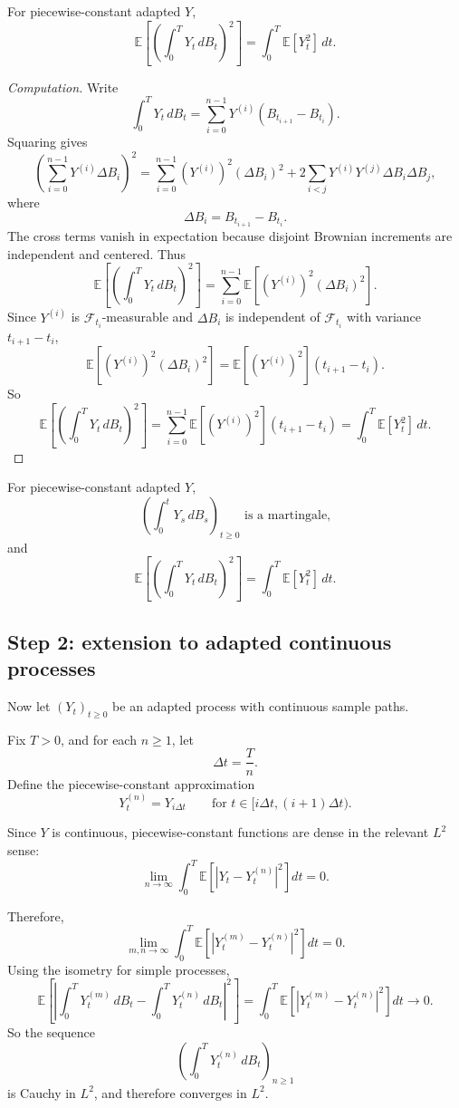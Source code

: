 \documentclass[11pt]{article}
\theoremstyle{definition}
\begin{document}
For piecewise-constant adapted \(Y\),
\[
\mathbb E\!\left[\left(\int_0^T Y_t\,dB_t\right)^2\right]
=
\int_0^T \mathbb E[Y_t^2]\,dt.
\]

\begin{proof}[Computation]
Write
\[
\int_0^T Y_t\,dB_t
=
\sum_{i=0}^{n-1} Y^{(i)}(B_{t_{i+1}}-B_{t_i}).
\]
Squaring gives
\[
\left(\sum_{i=0}^{n-1} Y^{(i)}\Delta B_i\right)^2
=
\sum_{i=0}^{n-1}(Y^{(i)})^2(\Delta B_i)^2
+
2\sum_{i<j} Y^{(i)}Y^{(j)}\Delta B_i\Delta B_j,
\]
where
\[
\Delta B_i=B_{t_{i+1}}-B_{t_i}.
\]
The cross terms vanish in expectation because disjoint Brownian increments are independent and centered. Thus
\[
\mathbb E\!\left[\left(\int_0^T Y_t\,dB_t\right)^2\right]
=
\sum_{i=0}^{n-1}\mathbb E\!\left[(Y^{(i)})^2(\Delta B_i)^2\right].
\]
Since \(Y^{(i)}\) is \(\mathcal F_{t_i}\)-measurable and \(\Delta B_i\) is independent of \(\mathcal F_{t_i}\) with variance \(t_{i+1}-t_i\),
\[
\mathbb E\!\left[(Y^{(i)})^2(\Delta B_i)^2\right]
=
\mathbb E[(Y^{(i)})^2](t_{i+1}-t_i).
\]
So
\[
\mathbb E\!\left[\left(\int_0^T Y_t\,dB_t\right)^2\right]
=
\sum_{i=0}^{n-1}\mathbb E[(Y^{(i)})^2](t_{i+1}-t_i)
=
\int_0^T \mathbb E[Y_t^2]\,dt.
\]
\end{proof}

\begin{keyformula}
For piecewise-constant adapted \(Y\),
\[
\left(\int_0^t Y_s\,dB_s\right)_{t\ge 0}
\text{ is a martingale,}
\]
and
\[
\mathbb E\!\left[\left(\int_0^T Y_t\,dB_t\right)^2\right]
=
\int_0^T \mathbb E[Y_t^2]\,dt.
\]
\end{keyformula}

\subsection{Step 2: extension to adapted continuous processes}

Now let \((Y_t)_{t\ge 0}\) be an adapted process with continuous sample paths.

Fix \(T>0\), and for each \(n\ge 1\), let
\[
\Delta t=\frac{T}{n}.
\]
Define the piecewise-constant approximation
\[
Y_t^{(n)}=Y_{i\Delta t}
\qquad \text{for } t\in [i\Delta t,(i+1)\Delta t).
\]

Since \(Y\) is continuous, piecewise-constant functions are dense in the relevant \(L^2\) sense:
\[
\lim_{n\to\infty}\int_0^T \mathbb E\!\left[\left|Y_t-Y_t^{(n)}\right|^2\right]dt=0.
\]

Therefore,
\[
\lim_{m,n\to\infty}\int_0^T \mathbb E\!\left[\left|Y_t^{(m)}-Y_t^{(n)}\right|^2\right]dt=0.
\]
Using the isometry for simple processes,
\[
\mathbb E\!\left[
\left|
\int_0^T Y_t^{(m)}\,dB_t
-
\int_0^T Y_t^{(n)}\,dB_t
\right|^2
\right]
=
\int_0^T \mathbb E\!\left[\left|Y_t^{(m)}-Y_t^{(n)}\right|^2\right]dt
\to 0.
\]
So the sequence
\[
\left(\int_0^T Y_t^{(n)}\,dB_t\right)_{n\ge 1}
\]
is Cauchy in \(L^2\), and therefore converges in \(L^2\).
\end{document}
